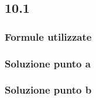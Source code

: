 \documentclass[../../main.tex]{subfiles}
\begin{document}
\subsection*{10.1}
\subsubsection*{Formule utilizzate}
\subsubsection*{Soluzione punto a}
\subsubsection*{Soluzione punto b}
\newpage
\end{document}
